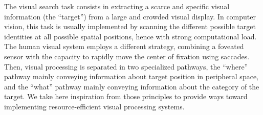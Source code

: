 The visual search task consists in extracting a scarce and specific visual information (the ``target'') from a large and crowded visual display. In computer vision, this task is usually implemented by scanning the different possible target identities at all possible spatial positions, hence with strong computational load. The human visual system employs a different strategy, combining a foveated sensor with the capacity to rapidly move the center of fixation using saccades. Then, visual processing is separated in two specialized pathways, the ``where'' pathway mainly conveying information about target position in peripheral space, and the ``what'' pathway mainly conveying information about the category of the target. We take here  inspiration from those principles to provide ways toward implementing resource-efficient visual processing systems.  